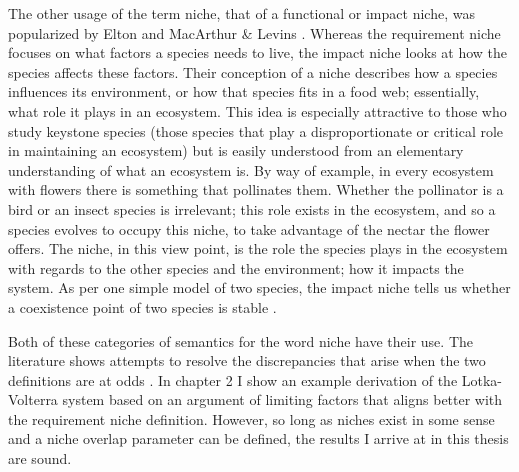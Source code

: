 The other usage of the term niche, that of a functional or impact niche, was popularized by Elton \cite{Elton1927} and MacArthur \& Levins \cite{MacArthur1967}. 
Whereas the requirement niche focuses on what factors a species needs to live, the impact niche looks at how the species affects these factors. 
Their conception of a niche describes how a species influences its environment, or how that species fits in a food web; essentially, what role it plays in an ecosystem. 
This idea is especially attractive to those who study keystone species (those species that play a disproportionate or critical role in maintaining an ecosystem) \cite{May1999,Chesson2000,Leibold2006} but is easily understood from an elementary understanding of what an ecosystem is. 
By way of example, in every ecosystem with flowers there is something that pollinates them. 
Whether the pollinator is a bird or an insect species is irrelevant; this role exists in the ecosystem, and so a species evolves to occupy this niche, to take advantage of the nectar the flower offers. 
The niche, in this view point, is the role the species plays in the ecosystem with regards to the other species and the environment; how it impacts the system. 
As per one simple model of two species, the impact niche tells us whether a coexistence point of two species is stable \cite{Tilman1982textbook}. 

Both of these categories of semantics for the word niche have their use.
The literature shows attempts to resolve the discrepancies that arise when the two definitions are at odds \cite{Leibold1995,Leibold2006}. 
In chapter 2 I show an example derivation of the Lotka-Volterra system based on an argument of limiting factors that aligns better with the requirement niche definition. 
However, so long as niches exist in some sense and a niche overlap parameter can be defined, the results I arrive at in this thesis are sound.

